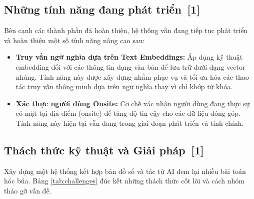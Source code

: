 \documentclass[12pt, a4paper]{article}
\begin{document}
\subsection[Những tính năng đang phát triển]{Những tính năng đang phát triển \,{\normalfont\small\textcolor{cyan!70!black}{[1]}}}
Bên cạnh các thành phần đã hoàn thiện, hệ thống vẫn đang tiếp tục phát triển và hoàn thiện một số tính năng nâng cao sau:
\begin{itemize}
    \item \textbf{Truy vấn ngữ nghĩa dựa trên Text Embeddings:} Áp dụng kỹ thuật embedding đối với các thông tin dạng văn bản để lưu trữ dưới dạng vector nhúng. Tính năng này được xây dựng nhằm phục vụ và tối ưu hóa các thao tác truy vấn thông minh dựa trên ngữ nghĩa thay vì chỉ khớp từ khóa.
    \item \textbf{Xác thực người dùng Onsite:} Cơ chế xác nhận người dùng đang thực sự có mặt tại địa điểm (onsite) để tăng độ tin cậy cho các dữ liệu đóng góp. Tính năng này hiện tại vẫn đang trong giai đoạn phát triển và tinh chỉnh.
\end{itemize}

\subsection[Thách thức kỹ thuật và Giải pháp]{Thách thức kỹ thuật và Giải pháp \,{\normalfont\small\textcolor{cyan!70!black}{[1]}}}
Xây dựng một hệ thống kết hợp bản đồ số và tác tử AI đem lại nhiều bài toán hóc búa. Bảng \ref{tab:challenges} đúc kết những thách thức cốt lõi và cách nhóm tháo gỡ vấn đề.
\end{document}
